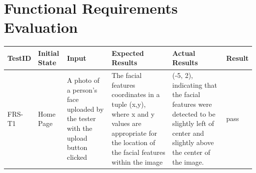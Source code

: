 \documentclass[12pt, oneside, openany, titlepage]{article}
\begin{document}
\tableofcontents

\listoftables %

\listoffigures %

\newpage


\section{Functional Requirements Evaluation}

  \begin{tabular}{|p{2cm}| p{3cm}| p{3cm}| p{3cm}|p{2cm}| p{1cm}| }
    \hline
    TestID & Initial State & Input & Expected Results & Actual Results & Result \\ 
    \hline
    FRS-T1 & Home Page & A photo of a person's face uploaded by the tester with the upload button clicked & The facial features coordinates in a tuple (x,y), where x and y values are appropriate for the location of the facial features within the image & (-5, 2), indicating that the facial features were detected to be slightly left of center and slightly above the center of the image. & pass \\ 
    \hline
\end{tabular}
\end{document}
